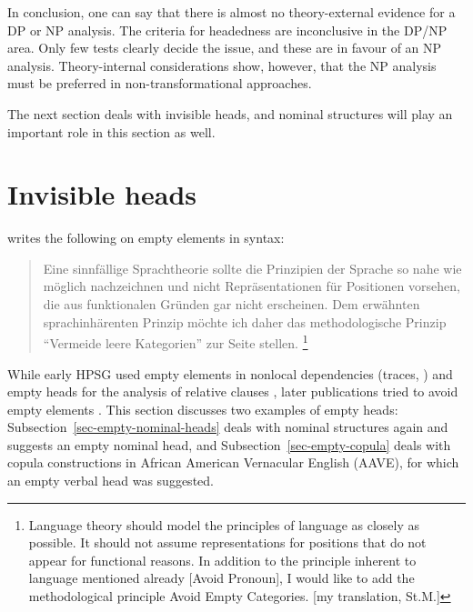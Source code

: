 \documentclass[output=paper
  ,nobabel
  ,draftmode
  ,uniformtopskip %
  ,colorlinks, citecolor=brown
]{langscibook}
\begin{document}
In conclusion, one can say that there is almost no theory-external evidence for a DP or NP analysis. The
criteria for headedness are inconclusive in the DP/NP area. Only few tests clearly decide
the issue, and these are in favour of an NP analysis. Theory-internal considerations show, however, that
the NP analysis must be preferred in non-transformational approaches. 




The next section deals with invisible heads, and nominal structures will play an important role in
this section as well.


\section{Invisible heads}
\label{sec-unsichtbar}

\largerpage[-1]
\citet[]{Wunderlich87d} writes the following on empty elements in syntax:
\begin{quote}
\label{page-wunderlich-on-empty-elements}
Eine sinnfällige Sprachtheorie sollte die Prinzipien der Sprache so nahe wie möglich nachzeichnen
und nicht Repräsentationen für Positionen vorsehen, die aus funktionalen Gründen gar nicht
erscheinen. Dem erwähnten sprachinhärenten Prinzip möchte ich daher das methodologische Prinzip
"`Vermeide leere Kategorien"' zur Seite stellen.
\citep[]{Wunderlich87d}\footnote{%
Language theory should model the principles of language as closely as possible. It should not assume
representations for positions that do not appear for functional reasons. In addition to the
principle inherent to language mentioned already [Avoid Pronoun], I would like to add the
methodological principle Avoid Empty Categories. [my translation, St.M.]
}
\end{quote}
While early HPSG used empty elements in nonlocal dependencies (traces, \citealp[]{ps2}) and empty heads for the
analysis of relative clauses \citep[]{ps2}, later publications tried to avoid empty elements
\citep*{SF94a,Sag97a,BMS2001a}. This section discusses two examples of empty heads: Subsection~\ref{sec-empty-nominal-heads} deals
with nominal structures again and suggests an empty nominal head, and
Subsection~\ref{sec-empty-copula} deals with copula constructions in African American
  Vernacular English (AAVE), for which an empty verbal head was suggested. 
\end{document}
